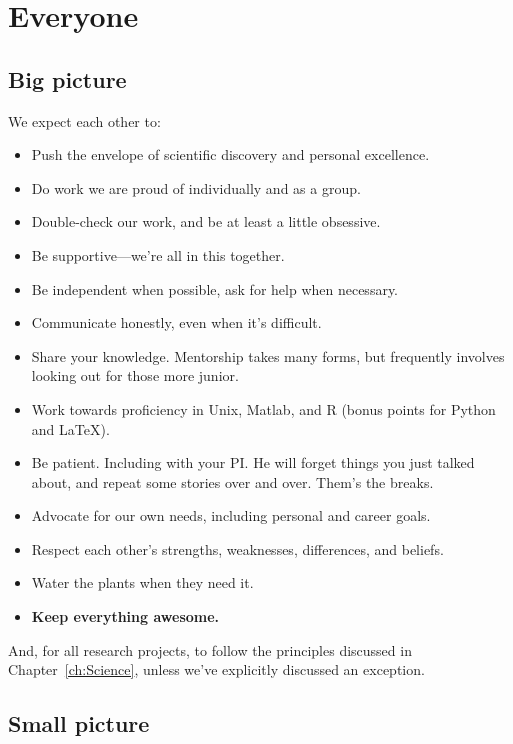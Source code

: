 \documentclass[letterpaper,12pt,oneside]{memoir}
\begin{document}



\section{Everyone}

\subsection{Big picture}

We expect each other to:

\begin{itemize}
\item Push the envelope of scientific discovery and personal excellence. 
\item Do work we are proud of individually and as a group.
\item Double-check our work, and be at least a little obsessive.
\item Be supportive---we're all in this together.
\item Be independent when possible, ask for help when necessary.
\item Communicate honestly, even when it's difficult.
\item Share your knowledge. Mentorship takes many forms, but frequently involves looking out for those more junior.
\item Work towards proficiency in Unix, Matlab, and R (bonus points for Python and LaTeX).
\item Be patient. Including with your PI. He will forget things you just talked about, and repeat some stories over and over. Them's the breaks.
\item Advocate for our own needs, including personal and career goals.
\item Respect each other's strengths, weaknesses, differences, and beliefs.
\item Water the plants when they need it.
\item \textbf{Keep everything awesome.}
\end{itemize}

And, for all research projects, to follow the principles discussed in Chapter~\ref{ch:Science}, unless we've explicitly discussed an exception.

\subsection{Small picture}
\end{document}
